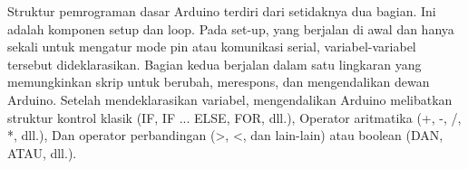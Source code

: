 	Struktur pemrograman dasar Arduino terdiri dari setidaknya dua bagian. Ini adalah komponen setup dan loop. Pada set-up, yang berjalan di awal dan hanya sekali untuk mengatur mode pin atau komunikasi serial, variabel-variabel tersebut dideklarasikan. Bagian kedua berjalan dalam satu lingkaran yang memungkinkan skrip untuk berubah, merespons, dan mengendalikan dewan Arduino. Setelah mendeklarasikan variabel, mengendalikan Arduino melibatkan struktur kontrol klasik (IF, IF ... ELSE, FOR, dll.), Operator aritmatika (+, -, /, *, dll.), Dan operator perbandingan (>, <, dan lain-lain) atau boolean (DAN, ATAU, dll.). 